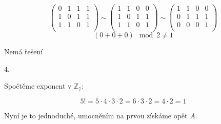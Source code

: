 \documentclass[10pt,a4paper]{article}
\begin{document}
\begin{equation*}
\left(
\begin{array}{ccc|c}
0 & 1 & 1 & 1 \\
1 & 0 & 1 & 1 \\
1 & 1 & 0 & 1 \\
\end{array}
\right)
\sim
\left(
\begin{array}{ccc|c}
1 & 1 & 0 & 0 \\
1 & 0 & 1 & 1 \\
1 & 1 & 0 & 1 \\
\end{array}
\right)
\sim
\left(
\begin{array}{ccc|c}
1 & 1 & 0 & 0 \\
0 & 1 & 1 & 1 \\
0 & 0 & 0 & 1 \\
\end{array}
\right) 
\end{equation*}
\begin{equation*}
(0 + 0 + 0) \mod 2 \neq 1
\end{equation*}

Nemá řešení

\hfill

4.

Spočtěme exponent v $\mathbb{Z}_7$:

\begin{equation*}
5! = 5 \cdot 4 \cdot 3 \cdot 2 = 6 \cdot 3 \cdot 2 = 4 \cdot 2 = 1
\end{equation*}

Nyní je to jednoduché, umocněním na prvou získáme opět $A$.
\end{document}
